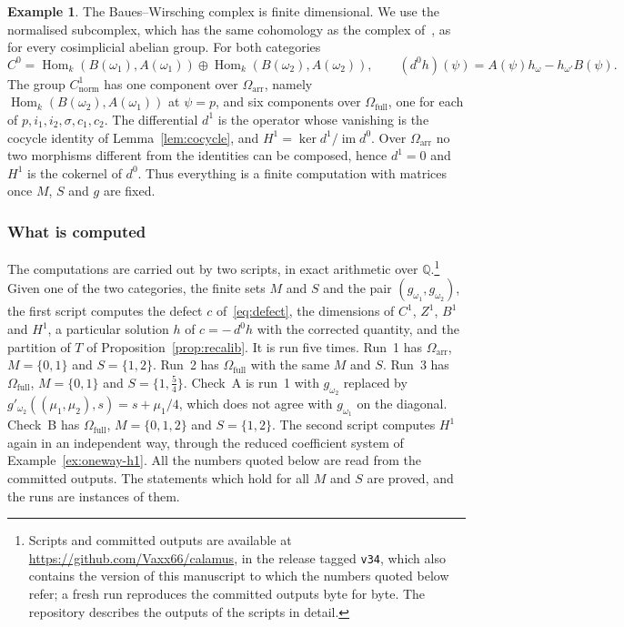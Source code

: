 \documentclass[11pt,a4paper]{article}
\theoremstyle{plain}
\theoremstyle{definition}
\newtheorem{example}[theorem]{Example}
\theoremstyle{remark}
\newcommand{\cat}[1]{\mathsf{#1}}
\newcommand{\catO}{\cat{\Omega}}
\DeclareMathOperator{\Hom}{Hom}
\begin{document}
\begin{example}
The Baues--Wirsching complex is finite dimensional. We use the normalised
subcomplex, which has the same cohomology as the complex
of~\cite[(1.4)]{baues_cohomology_1985}, as for every cosimplicial abelian
group. For both categories
\[
C^{0} = \Hom_k(B(\omega_1), A(\omega_1)) \oplus \Hom_k(B(\omega_2),
A(\omega_2)),
\qquad
(d^{0}h)(\psi) = A(\psi)h_\omega - h_{\omega'}B(\psi).
\]
The group $C^{1}_{\mathrm{norm}}$ has one component over
$\catO_{\mathrm{arr}}$, namely $\Hom_k(B(\omega_2),A(\omega_1))$ at
$\psi = p$, and six components over $\catO_{\mathrm{full}}$, one for each of
$p, i_1, i_2, \sigma, c_1, c_2$. The differential $d^{1}$ is the operator
whose vanishing is the cocycle identity of Lemma~\ref{lem:cocycle}, and
$H^{1} = \ker d^{1}/\operatorname{im} d^{0}$. Over $\catO_{\mathrm{arr}}$ no
two morphisms different from the identities can be composed, hence
$d^{1} = 0$ and $H^{1}$ is the cokernel of $d^{0}$. Thus everything is a
finite computation with matrices once $M$, $S$ and $g$ are fixed.
\end{example}

\subsubsection*{What is computed}

The computations are carried out by two scripts, in exact arithmetic over
$\mathbb{Q}$.\footnote{Scripts and committed outputs are available at
\url{https://github.com/Vaxx66/calamus}, in the release tagged
\texttt{v34}, which also contains the version of this manuscript to which
the numbers quoted below refer; a fresh run reproduces the committed outputs
byte for byte. The repository describes the outputs of the scripts in
detail.} Given one of the two categories, the finite sets $M$ and $S$ and the
pair $(g_{\omega_1}, g_{\omega_2})$, the first script computes the defect $c$
of~\eqref{eq:defect}, the dimensions of $C^{1}$, $Z^{1}$, $B^{1}$ and $H^{1}$,
a particular solution $h$ of $c = -\,d^{0}h$ with the corrected quantity, and
the partition of $T$ of Proposition~\ref{prop:recalib}. It is run five times.
Run~1 has $\catO_{\mathrm{arr}}$, $M = \{0,1\}$ and $S = \{1,2\}$. Run~2 has
$\catO_{\mathrm{full}}$ with the same $M$ and $S$. Run~3 has
$\catO_{\mathrm{full}}$, $M = \{0,1\}$ and $S = \{1,\tfrac54\}$. Check~A is
run~1 with $g_{\omega_2}$ replaced by
$g'_{\omega_2}((\mu_1,\mu_2),s) = s + \mu_1/4$, which does not agree with
$g_{\omega_1}$ on the diagonal. Check~B has $\catO_{\mathrm{full}}$,
$M = \{0,1,2\}$ and $S = \{1,2\}$. The second script computes $H^{1}$ again in
an independent way, through the reduced coefficient system of
Example~\ref{ex:oneway-h1}. All the numbers quoted below are read from the
committed outputs. The statements which hold for all $M$ and $S$ are proved,
and the runs are instances of them.
\end{document}
